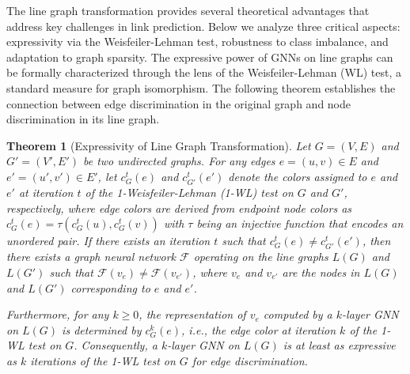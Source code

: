 \documentclass[pdflatex,sn-mathphys-num]{sn-jnl}%
\theoremstyle{thmstyleone}%
\newtheorem{theorem}{Theorem}%
\theoremstyle{thmstyletwo}%
\theoremstyle{thmstylethree}%
\theoremstyle{plain} %
\theoremstyle{definition} %
\theoremstyle{remark} %
\theoremstyle{plain} %
\begin{document}
The line graph transformation provides several theoretical advantages that address key challenges in link prediction. Below we analyze three critical aspects: expressivity via the Weisfeiler-Lehman test, robustness to class imbalance, and adaptation to graph sparsity.
The expressive power of GNNs on line graphs can be formally characterized through the lens of the Weisfeiler-Lehman (WL) test, a standard measure for graph isomorphism.
The following theorem establishes the connection between edge discrimination in the original graph and node discrimination in its line graph.

\begin{theorem}[Expressivity of Line Graph Transformation]
\label{thm:wl_expressivity}
Let $G = (V, E)$ and $G' = (V', E')$ be two undirected graphs. For any edges $e = (u, v) \in E$ and $e' = (u', v') \in E'$, let $c^t_G(e)$ and $c^t_{G'}(e')$ denote the colors assigned to $e$ and $e'$ at iteration $t$ of the 1-Weisfeiler-Lehman (1-WL) test on $G$ and $G'$, respectively, where edge colors are derived from endpoint node colors as $c^t_G(e) = \tau(c^t_G(u), c^t_G(v))$ with $\tau$ being an injective function that encodes an unordered pair. If there exists an iteration $t$ such that $c^t_G(e) \neq c^t_{G'}(e')$, then there exists a graph neural network $\mathcal{F}$ operating on the line graphs $L(G)$ and $L(G')$ such that $\mathcal{F}(v_e) \neq \mathcal{F}(v_{e'})$, where $v_e$ and $v_{e'}$ are the nodes in $L(G)$ and $L(G')$ corresponding to $e$ and $e'$.

Furthermore, for any $k \geq 0$, the representation of $v_e$ computed by a $k$-layer GNN on $L(G)$ is determined by $c^k_G(e)$, i.e., the edge color at iteration $k$ of the 1-WL test on $G$. Consequently, a $k$-layer GNN on $L(G)$ is at least as expressive as $k$ iterations of the 1-WL test on $G$ for edge discrimination.
\end{theorem}
\end{document}
